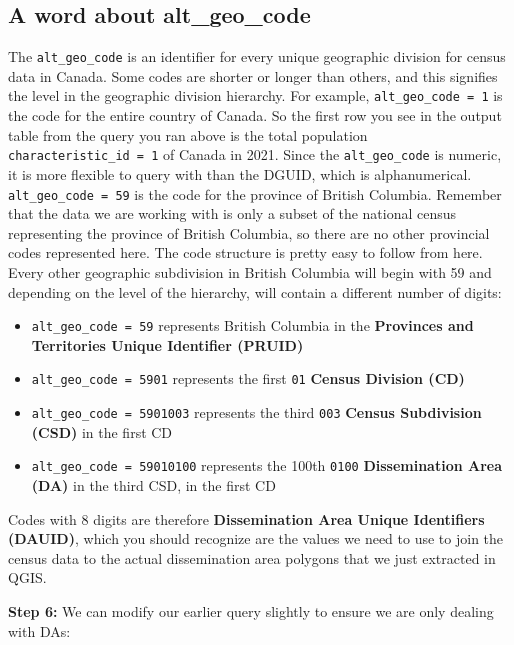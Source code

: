 \documentclass[
]{book}
\begin{document}
\hypertarget{a-word-about-alt_geo_code}{%
\subsection{A word about alt\_geo\_code}\label{a-word-about-alt_geo_code}}

The \texttt{alt\_geo\_code} is an identifier for every unique geographic division for census data in Canada. Some codes are shorter or longer than others, and this signifies the level in the geographic division hierarchy. For example, \texttt{alt\_geo\_code\ =\ 1} is the code for the entire country of Canada. So the first row you see in the output table from the query you ran above is the total population \texttt{characteristic\_id\ =\ 1} of Canada in 2021. Since the \texttt{alt\_geo\_code} is numeric, it is more flexible to query with than the DGUID, which is alphanumerical. \texttt{alt\_geo\_code\ =\ 59} is the code for the province of British Columbia. Remember that the data we are working with is only a subset of the national census representing the province of British Columbia, so there are no other provincial codes represented here. The code structure is pretty easy to follow from here. Every other geographic subdivision in British Columbia will begin with 59 and depending on the level of the hierarchy, will contain a different number of digits:

\begin{itemize}
\item
  \texttt{alt\_geo\_code\ =\ 59} represents British Columbia in the \textbf{Provinces and Territories Unique Identifier (PRUID)}
\item
  \texttt{alt\_geo\_code\ =\ 5901} represents the first \texttt{01} \textbf{Census Division (CD)}
\item
  \texttt{alt\_geo\_code\ =\ 5901003} represents the third \texttt{003} \textbf{Census Subdivision (CSD)} in the first CD
\item
  \texttt{alt\_geo\_code\ =\ 59010100} represents the 100th \texttt{0100} \textbf{Dissemination Area (DA)} in the third CSD, in the first CD
\end{itemize}

Codes with 8 digits are therefore \textbf{Dissemination Area Unique Identifiers (DAUID)}, which you should recognize are the values we need to use to join the census data to the actual dissemination area polygons that we just extracted in QGIS.

\textbf{Step 6:} We can modify our earlier query slightly to ensure we are only dealing with DAs:
\end{document}

